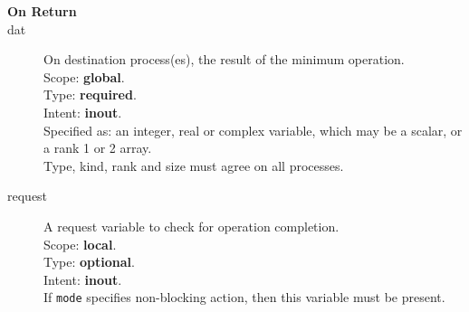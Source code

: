 \begin{description}
\item[\bf On Return]
\item[dat] On destination process(es), the result of the minimum operation.\\
Scope: {\bf global}.\\
Type: {\bf required}.\\
Intent: {\bf inout}.\\
Specified as: an integer, real or complex variable, which may be a
scalar, or a rank 1 or 2 array. \\
Type, kind, rank and size must agree on all processes.
\item[request] A request variable to check for operation completion.\\
Scope: {\bf local}.\\
Type: {\bf optional}.\\
Intent: {\bf inout}.\\
If \verb|mode| specifies non-blocking action, then this
variable must be present.
\end{description}


